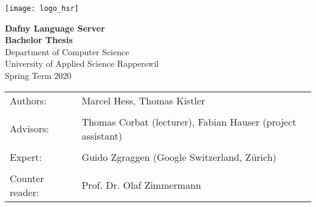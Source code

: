 \begin{titlepage}
\thispagestyle{empty}

\newcommand\thesisAuthors{Marcel Hess, Thomas Kistler}
\newcommand\thesisTitle{Dafny Language Server}
\newcommand\thesisSubject{Bachelor Thesis}
\newcommand\thesisUniversity{University of Applied Science Rapperswil}
\newcommand\thesisDepartment{Department of Computer Science}
\newcommand\thesisAdvisors{Thomas Corbat (lecturer), Fabian Hauser (project assistant)}
\newcommand\thesisExpert{Guido Zgraggen (Google Switzerland, Zürich)}
\newcommand\thesisPeriod{Spring Term 2020}
\newcommand\thesisReader{Prof. Dr. Olaf Zimmermann}

    \texttt{[image: logo\_hsr]}\\[40mm]

    \begin{center}

    	\Huge
    	\textbf{\thesisTitle} \\
    	\textbf{\thesisSubject} \\[20mm]

    	\LARGE
    	\thesisDepartment\\
    	\thesisUniversity\\[10mm]

    	\thesisPeriod \\[15mm]

    	\vfill

    \end{center}

\begin{tabularx}{\textwidth}{l X}
			\large Authors: & \large{ \thesisAuthors} \tabularnewline
			\tabularnewline
			\large Advisors: & \large{\thesisAdvisors} \tabularnewline
			\tabularnewline
			\large Expert: & \large \thesisExpert \tabularnewline
			\tabularnewline
			\large Counter reader: & \large \thesisReader
		\end{tabularx}

\end{titlepage}
